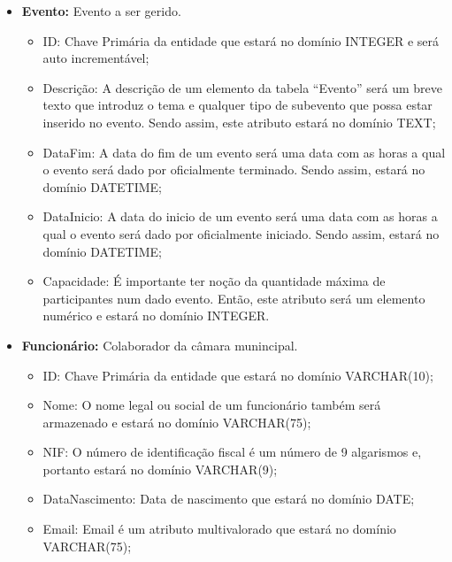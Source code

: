 \documentclass[a4paper,12pt]{scrreprt}
\begin{document}
             \begin{itemize}
                 \item{\textbf{Evento:}} Evento a ser gerido. 
                     \begin{itemize}
                     \item{ID:} Chave Primária da entidade que estará no domínio INTEGER
                       e será auto incrementável;
                     \item{Descrição:} A descrição de um elemento da tabela ``Evento'' será
                       um breve texto que introduz o tema e qualquer tipo de subevento que possa
                       estar inserido no evento. Sendo assim, este atributo estará no domínio TEXT;
                     \item{DataFim:} A data do fim de um evento será uma data com as horas a qual
                       o evento será dado por oficialmente terminado. Sendo assim, estará no domínio
                       DATETIME;
                     \item{DataInicio:} A data do inicio de um evento será uma data com as horas a qual
                       o evento será dado por oficialmente iniciado. Sendo assim, estará no domínio
                       DATETIME;
                     \item{Capacidade:} É importante ter noção da quantidade máxima de participantes num
                       dado evento. Então, este atributo será um elemento numérico e estará no domínio INTEGER.
                     \end{itemize}
                 \item{\textbf{Funcionário:}} Colaborador da câmara munincipal.
                     \begin{itemize}
                     \item{ID:} Chave Primária da entidade que estará no domínio VARCHAR(10);
                     \item{Nome:} O nome legal ou social de um funcionário também será armazenado e estará
                       no domínio VARCHAR(75);
                     \item{NIF:} O número de identificação fiscal é um número de 9 algarismos e, portanto estará
                       no domínio VARCHAR(9);
                     \item{DataNascimento:} Data de nascimento que estará no domínio DATE;
                       
                     \item{Email:} Email é um atributo multivalorado que estará no domínio VARCHAR(75);
                       

\end{itemize}
\end{itemize}
\end{document}
